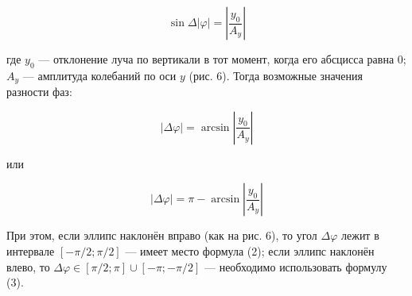 \documentclass[14pt]{article}
\begin{document}
\begin{equation}
\sin \Delta \left|\varphi\right| = \left|\frac{y_0}{A_y}\right|
\end{equation}

\noindent где $y_0$ --- отклонение луча по вертикали в тот момент, когда его абсцисса равна 0; $A_y$ --- амплитуда колебаний по оси 
$y$ (рис. 6). Тогда возможные значения разности фаз:

\begin{equation}
\left|\Delta \varphi\right| = \arcsin \left|\frac{y_0}{A_y}\right|
\end{equation}

\noindent или

\begin{equation}
\left|\Delta \varphi\right| = \pi - \arcsin \left|\frac{y_0}{A_y}\right|
\end{equation}

\noindent При этом, если эллипс наклонён вправо (как на рис. 6), то угол $\Delta\varphi$ лежит в интервале $[-\pi/2; \pi/2]$ — имеет место формула (2); если эллипс наклонён влево, то $\Delta\varphi \in [\pi/2; \pi] \cup [-\pi; -\pi/2]$ — необходимо
использовать формулу (3).

%
%
\end{document}
